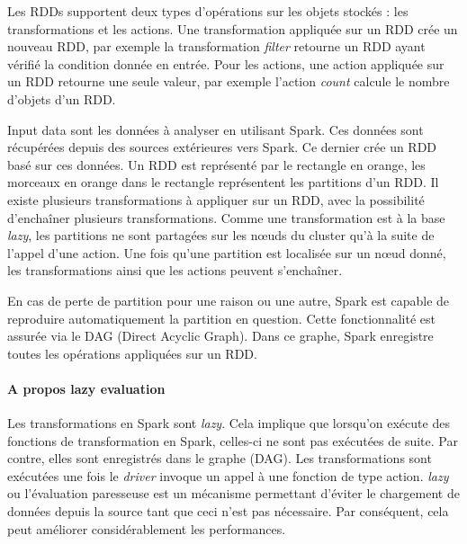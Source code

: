 Les RDDs supportent deux types d'opérations sur les objets stockés : les transformations et les actions. Une  transformation appliquée sur un RDD crée un nouveau RDD, par exemple la transformation \textit{filter} retourne un RDD ayant vérifié la condition donnée en entrée.  Pour les actions, une action appliquée sur un RDD retourne une seule valeur, par exemple l'action \textit{count} calcule le nombre d'objets d'un RDD.

Input data sont les données à analyser en utilisant Spark. Ces données sont récupérées depuis des sources extérieures vers Spark. Ce dernier crée un RDD basé sur ces données. Un RDD est représenté par le rectangle en orange, les morceaux en orange dans le rectangle représentent les partitions d'un RDD. 
Il existe plusieurs transformations à appliquer sur un RDD, avec la possibilité d'enchaîner plusieurs transformations. Comme une transformation est à la base  \textit{lazy}, les partitions ne sont partagées sur les n\oe{}uds du cluster qu'à la suite de l'appel d'une action. Une fois qu'une partition est localisée sur un n\oe{}ud donné, les transformations ainsi que les actions peuvent s'enchaîner.

En cas de perte de partition pour une raison ou une autre, Spark est capable de reproduire automatiquement la partition en question. Cette fonctionnalité est assurée via le DAG (Direct Acyclic Graph). Dans ce graphe, Spark enregistre toutes les opérations appliquées sur un RDD.




\paragraph{A propos lazy evaluation} \label{lazy-evaluation}
Les transformations en Spark sont \textit{lazy}. Cela implique que lorsqu'on exécute des fonctions de transformation en Spark, celles-ci ne sont pas exécutées de suite. Par contre, elles sont enregistrés dans le graphe (DAG).  Les transformations sont exécutées une fois le \textit{driver} invoque un appel à une fonction de type action. \textit{lazy} ou l'évaluation paresseuse est un mécanisme permettant d'éviter le chargement de données depuis la source tant que ceci n'est pas nécessaire. Par conséquent, cela peut améliorer considérablement les performances.

